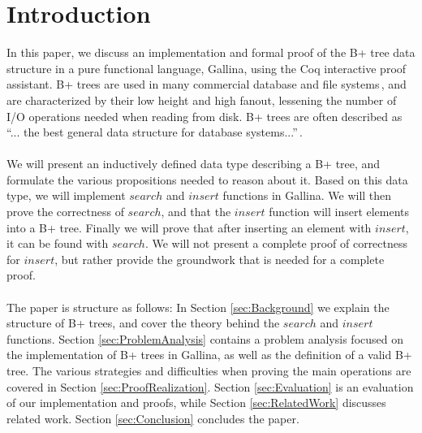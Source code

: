 \section{Introduction}
\label{sec:Introduction}
In this paper, we discuss an implementation and formal proof of the B+ tree data structure in a pure functional language, Gallina, using the Coq interactive proof assistant. B+ trees are used in many commercial database and file systems\,\cite[p. 359]{ramakrishnan2003database}, and are characterized by their low height and high fanout, lessening the number of I/O operations needed when reading from disk. B+ trees are often described as ``... the best general data structure for database systems...''\,\cite[p. 84]{shasha2002database}.
\paragraph{}
We will present an inductively defined data type describing a B+ tree, and formulate the various propositions needed to reason about it. Based on this data type, we will implement $search$ and $insert$ functions in Gallina. We will then prove the correctness of $search$, and that the $insert$ function will insert elements into a B+ tree. Finally we will prove that after inserting an element with $insert$, it can be found with $search$. We will not present a complete proof of correctness for $insert$, but rather provide the groundwork that is needed for a complete proof.
\paragraph{}
The paper is structure as follows: In Section \ref{sec:Background} we explain the structure of B+ trees, and cover the theory behind the $search$ and $insert$ functions. Section \ref{sec:ProblemAnalysis} contains a problem analysis focused on the implementation of B+ trees in Gallina, as well as the definition of a valid B+ tree. The various strategies and difficulties when proving the main operations are covered in Section \ref{sec:ProofRealization}. Section \ref{sec:Evaluation} is an evaluation of our implementation and proofs, while Section \ref{sec:RelatedWork} discusses related work. Section \ref{sec:Conclusion} concludes the paper.
